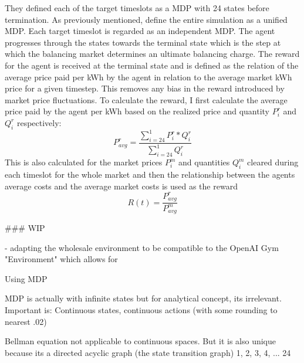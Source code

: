 They defined each of the target timeslots as a \ac{MDP} with 24 states before
termination. As previously mentioned, \citet{tactexurieli2016mdp} define the entire simulation as a unified \ac{MDP}.
Each target timeslot is regarded as
an independent \ac{MDP}. The agent progresses through the states towards the terminal state which is the step at which
the balancing market determines an ultimate balancing charge. The reward for the agent is received at the terminal state
and is defined as the relation of the average price paid per \ac{kWh} by the agent in relation to the average market
\ac{kWh}
price for a given timestep. This removes any bias in the reward introduced by market price fluctuations. To calculate
the reward, I first calculate the average price paid by the agent per \ac{kWh} based on the realized price and quantity
$P^r_i$ and $Q^r_i$ respectively:
\begin{equation}
    \label{eq:Average price per kWh for a given target timeslot}
    P^{r}_{avg} =\frac{\sum ^{1}_{i=24} P^{r}_{i} *Q^{r}_{i}}{\sum ^{1}_{i=24} Q^{r}_{i}}


\end{equation}
This is also calculated for the market prices $P^m_{i}$ and quantities $Q^m_i$ cleared during each timeslot for the whole market and then the
relationship between the agents average costs and the average market costs is used as the reward
\begin{equation}
    R(t) = \frac{P^r_{avg}}{P^m_{avg}}
\end{equation}

\begin{markdown}

### WIP 

- adapting the wholesale environment to be  compatible to the OpenAI Gym "Environment" which allows for 

\end{markdown}


Using \ac {MDP}

\ac {MDP} is actually with infinite states but for analytical concept, its irrelevant. Important is: Continuous states,
continuous actions (with some rounding to nearest .02)

Bellman equation not applicable to continuous spaces. But it is also unique because its a directed acyclic graph (the
state transition graph) 1, 2, 3, 4, ... 24

